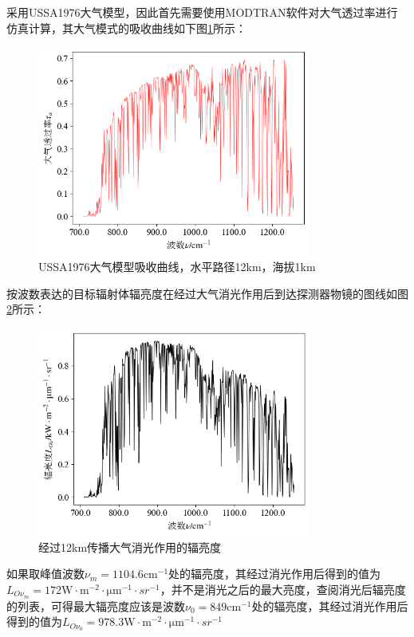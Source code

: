 \documentclass[11pt]{article}
\begin{document}
采用USSA1976大气模型，因此首先需要使用MODTRAN软件对大气透过率进行仿真计算，其大气模式的吸收曲线如下图\ref{fig:USSA1976大气模型吸收曲线，水平路径12km，海拔1km}所示：
\begin{figure}[H]
  \centering
  \includegraphics[width=0.8\textwidth]{大气透过率，波数，12km.PNG}
  \caption{USSA1976大气模型吸收曲线，水平路径12km，海拔1km}
  \label{fig:USSA1976大气模型吸收曲线，水平路径12km，海拔1km}
\end{figure}
\par
按波数表达的目标辐射体辐亮度在经过大气消光作用后到达探测器物镜的图线如图\ref{fig:辐亮度，已消光，12km}所示：
\begin{figure}[H]
  \centering
  \includegraphics[width=0.8\textwidth]{普朗克公式，辐亮度，波数，已消光，12km.PNG}
  \caption{经过12km传播大气消光作用的辐亮度}
  \label{fig:辐亮度，已消光，12km}
\end{figure}
\par
如果取峰值波数$\nu_m=1104.6\unit{\cm^{-1}}$处的辐亮度，其经过消光作用后得到的值为$L_{O\nu_m}=172\unit{\W\cdot \m^{-2}\cdot \um^{-1}\cdot sr^{-1}}$，并不是消光之后的最大亮度，查阅消光后辐亮度的列表，可得最大辐亮度应该是波数$\nu_0=849\unit{\cm^{-1}}$处的辐亮度，其经过消光作用后得到的值为$L_{O\nu_0}=978.3\unit{\W\cdot \m^{-2}\cdot \um^{-1}\cdot sr^{-1}}$
\end{document}
